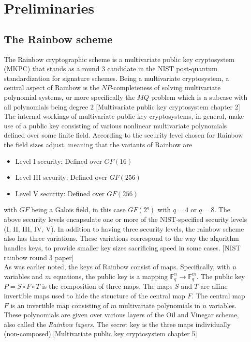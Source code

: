 \section{Preliminaries}
\subsection{The Rainbow scheme}
The Rainbow cryptographic scheme is a multivariate public key cryptosystem (MKPC) that stands as a round 3 candidate in the NIST post-quantum standardization for signature schemes. Being a multivariate cryptosystem, a central aspect of Rainbow is the $NP$-completeness of solving multivariate polynomial systems, or more specifically the $MQ$ problem which is a subcase with all polynomials being degree 2 [Multivariate public key cryptosystem chapter 2]
\medskip\\
The internal workings of multivariate public key cryptosystems, in general, make use of a public key consisting of various nonlinear multivariate polynomials defined over some finite field. According to the security level chosen for Rainbow the field sizes adjust, meaning that the variants of Rainbow are 
\begin{itemize}
    \item Level I security: Defined over $GF(16)$
    \item Level III security: Defined over $GF(256)$
    \item Level V security: Defined over $GF(256)$
\end{itemize}
with $GF$ being a Galois field, in this case $GF(2^q)$ with $q = 4$ or $q=8$. The above security levels encapsulate one or more of the NIST-specified security levels (I, II, III, IV, V). In addition to having three security levels, the rainbow scheme also has three variations. These variations correspond to the way the algorithm handles keys, to provide smaller key sizes sacrificing speed in some cases. [NIST rainbow round 3 paper]\medskip\\
As was earlier noted, the keys of Rainbow consist of maps. Specifically, with $n$ variables and $m$ equations, the public key is a mapping $\mathbb{F}_q^n \rightarrow \mathbb{F}_q^m$. The public key $P = S \circ F \circ T$ is the composition of three maps. The maps $S$ and $T$ are affine invertible maps used to hide the structure of the central map $F$. The central map $F$ is an invertible map consisting of $m$ multivariate polynomials in $n$ variables. These polynomials are given over various layers of the Oil and Vinegar scheme, also called the \textit{Rainbow layers}. The secret key is the three maps individually (non-composed).[Multivariate public key cryptosystem chapter 5]\medskip\\
